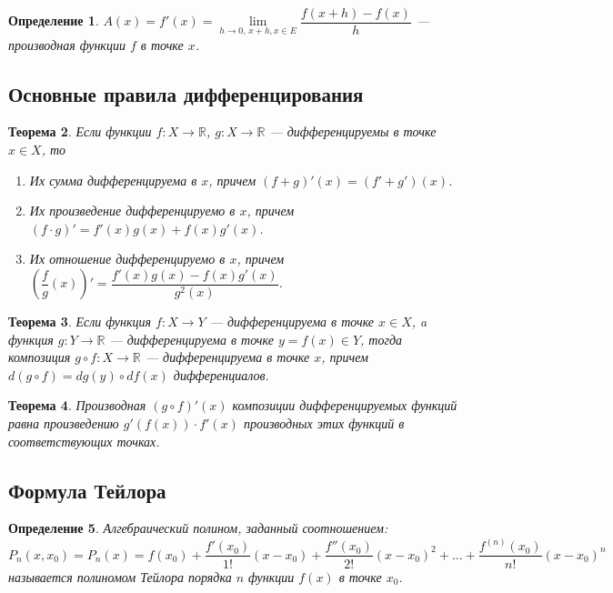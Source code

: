 \documentclass[12pt]{report}
\theoremstyle{plain}
\newtheorem{theorem}{Теорема}[chapter]
\newtheorem{definition}[theorem]{Определение}
\newcommand{\R}{\mathbb R}
\begin{document}
\begin{definition}
$A(x) = f'(x) = \lim\limits_{h\rightarrow 0,\, x+h, x\in E} \dfrac{f(x + h) - f(x)}{h}$ --- производная
функции $f$ в точке $x$.
\end{definition}

\subsection{Основные правила дифференцирования}
\begin{theorem}
Если функции $f: X \rightarrow \R$, $g: X \rightarrow \R$ --- дифференцируемы
в точке $x \in X$, то
\begin{enumerate}
  \item Их сумма дифференцируема в $x$, причем $(f + g)'(x) = (f' + g')(x)$.
  \item Их произведение дифференцируемо в $x$, причем $(f \cdot g)' = f'(x) g(x) + f(x) g'(x)$.
  \item Их отношение дифференцируемо в $x$, причем $\left(\dfrac{f}{g}(x)\right)' = \dfrac{f'(x) g(x) - f(x) g'(x)}{g^2(x)}$.
\end{enumerate}
\end{theorem}

\begin{theorem}
Если функция $f: X \rightarrow Y$ --- дифференцируема в точке $x \in X$,
a функция $g: Y \rightarrow \R$ --- дифференцируема в точке $y = f(x) \in Y$,
тогда композиция $g \circ f: X \rightarrow \R$ --- дифференцируема в точке $x$,
причем $d (g \circ f) = dg(y) \circ df(x)$ дифференциалов.
\end{theorem}

\begin{theorem}
Производная $(g \circ f)'(x)$ композиции дифференцируемых функций равна
произведению $g'(f(x)) \cdot f'(x)$ производных этих функций в соответствующих точках.
\end{theorem}

\subsection{Формула Тейлора}

\begin{definition}
Алгебраический полином, заданный соотношением:
$$
P_n(x, x_0) = P_n(x) = f(x_0) + \dfrac{f'(x_0)}{1!}(x - x_0) + \dfrac{f''(x_0)}{2!}(x - x_0)^2
+ \dots + \dfrac{f^{(n)}(x_0)}{n!} (x - x_0)^n
$$
называется полиномом Тейлора порядка $n$ функции $f(x)$ в точке $x_0$.
\end{definition}
\end{document}
